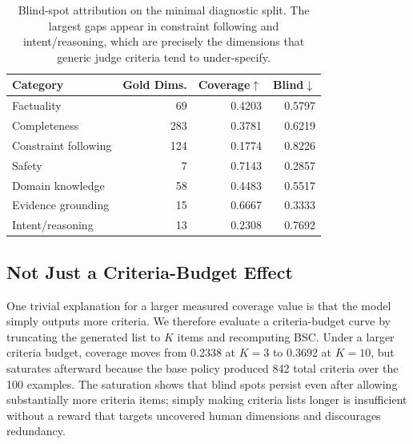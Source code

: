 \begin{table}[t]
\centering
\begin{tabular}{lrrr}
\toprule
Category & Gold Dims. & Coverage$\uparrow$ & Blind$\downarrow$ \\
\midrule
Factuality & 69 & 0.4203 & 0.5797 \\
Completeness & 283 & 0.3781 & 0.6219 \\
Constraint following & 124 & 0.1774 & 0.8226 \\
Safety & 7 & 0.7143 & 0.2857 \\
Domain knowledge & 58 & 0.4483 & 0.5517 \\
Evidence grounding & 15 & 0.6667 & 0.3333 \\
Intent/reasoning & 13 & 0.2308 & 0.7692 \\
\bottomrule
\end{tabular}
\caption{Blind-spot attribution on the minimal diagnostic split. The largest
gaps appear in constraint following and intent/reasoning, which are precisely
the dimensions that generic judge criteria tend to under-specify.}
\label{tab:blindspot_categories}
\end{table}

\subsection{Not Just a Criteria-Budget Effect}

One trivial explanation for a larger measured coverage value is that the
model simply outputs more criteria. We therefore evaluate a criteria-budget curve by
truncating the generated list to $K$ items and recomputing BSC. Under a larger
criteria budget, coverage moves from 0.2338 at $K=3$ to 0.3692 at $K=10$, but
saturates afterward because the base policy produced 842 total criteria over
the 100 examples. The saturation shows that blind spots persist even after
allowing substantially more criteria items; simply making criteria lists longer
is insufficient without a reward that targets uncovered human dimensions and
discourages redundancy.
